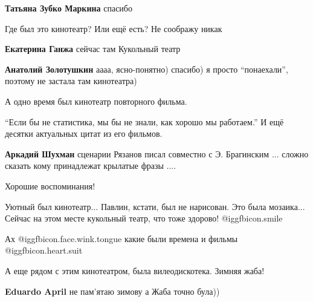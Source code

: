 \begin{itemize}
\textbf{Татьяна Зубко Маркина} спасибо

Где был это кинотеатр? Или ещё есть? Не соображу никак

\begin{itemize} %
\textbf{Екатерина Ганжа} сейчас там Кукольный театр

\textbf{Анатолий Золотушкин} аааа, ясно-понятно) спасибо) я просто \enquote{понаехали}, поэтому не застала там кинотеатра)

А одно время был кинотеатр повторного фильма.
\end{itemize} %


\enquote{Если бы не статистика, мы бы не знали, как хорошо мы работаем.} И ещё десятки
актуальных цитат из его фильмов.

\begin{itemize} %
\textbf{Аркадий Шухман} сценарии Рязанов писал совместно с Э. Брагинским ... сложно сказать кому принадлежат крылатые фразы ....
\end{itemize} %

Хорошие воспоминания!

Уютный был кинотеатр... Павлин, кстати, был не нарисован. Это была мозаика... Сейчас на этом месте кукольный театр, что тоже здорово! @igg{fbicon.smile} 

Ах  @igg{fbicon.face.wink.tongue} какие были времена и фильмы @igg{fbicon.heart.suit}

А еще рядом с этим кинотеатром, была вилеодискотека.
Зимняя жаба!

\textbf{Eduardo April} не пам’ятаю зимову а Жаба точно була))
\end{itemize} %
